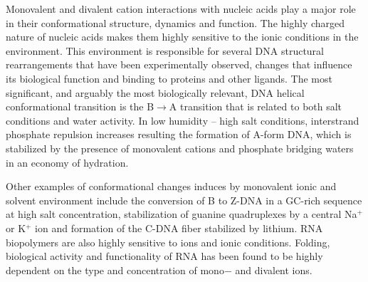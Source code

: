 \documentclass[9pt,lessons]{livecoms}
\begin{document}
Monovalent and divalent cation interactions with nucleic acids play a
major role in their conformational structure, dynamics and
function\cite{Sharp1995}. The highly charged nature of nucleic acids
makes them highly sensitive to the ionic conditions in the
environment\cite{Saenger1988}. This environment is responsible for
several DNA structural rearrangements that have been experimentally
observed, changes that influence its biological function and binding to proteins
and other ligands\cite{McFail-Isom1999}. The most significant, and
arguably the most biologically relevant, DNA helical conformational
transition is the B$\rightarrow$A transition that is related to both
salt conditions and water activity\cite{Kulkarni2017,Waters2016}. In
low humidity – high salt conditions, interstrand phosphate repulsion
increases resulting the formation of A-form DNA, which is stabilized
by the presence of monovalent cations and phosphate bridging waters in
an economy of hydration\cite{Kulkarni2017,Saenger1986,Cheatham3rd1997}.

Other examples of conformational changes induces by monovalent ionic and solvent
environment include the conversion of B to Z-DNA in a GC-rich sequence
at high salt concentration\cite{Saenger1988}, stabilization of guanine
quadruplexes by a central Na$^{+}$ or K$^{+}$
ion\cite{Bhattacharyya2016} and formation of
the C-DNA fiber stabilized by lithium\cite{Langridge1960,Marvin1961}. RNA
biopolymers are also highly sensitive to ions and ionic
conditions. Folding, biological activity and functionality of RNA has
been found to be highly dependent on the type and concentration of
mono$-$ and divalent ions\cite{jenkins2017,bevil2016,westhof2000,
  westhof2001}.
\end{document}
